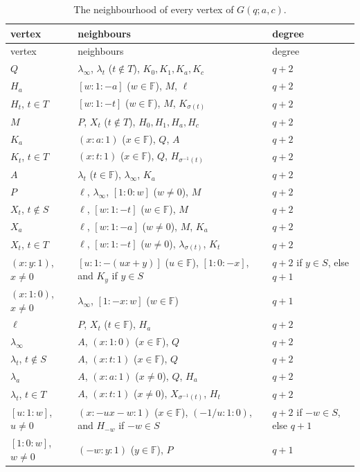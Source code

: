 \documentclass[11pt]{amsart}
\theoremstyle{definition}
\theoremstyle{remark}
\numberwithin{equation}{section}
\newcommand{\F}{\mathbb F}
\begin{document}
\begin{longtable}{@{}l p{8.4cm} l@{}}
\caption{The neighbourhood of every vertex of $G(q;a,c)$.}\label{tab:hat4}\\
\toprule vertex & neighbours & degree\\ \midrule\endfirsthead
\toprule vertex & neighbours & degree\\ \midrule\endhead
\bottomrule\endfoot
$Q$ & $\lambda_\infty$, $\lambda_t$ ($t\notin T$), $K_0,K_1,K_a,K_c$ & $q+2$\\
$H_a$ & $[w:1:-a]$ ($w\in\F$), $M$, $\ell$ & $q+2$\\
$H_t$, $t\in T$ & $[w:1:-t]$ ($w\in\F$), $M$, $K_{\sigma(t)}$ & $q+2$\\
$M$ & $P$, $X_t$ ($t\notin T$), $H_0,H_1,H_a,H_c$ & $q+2$\\
$K_a$ & $(x:a:1)$ ($x\in\F$), $Q$, $A$ & $q+2$\\
$K_t$, $t\in T$ & $(x:t:1)$ ($x\in\F$), $Q$, $H_{\sigma^{-1}(t)}$ & $q+2$\\
$A$ & $\lambda_t$ ($t\in\F$), $\lambda_\infty$, $K_a$ & $q+2$\\
$P$ & $\ell$, $\lambda_\infty$, $[1:0:w]$ ($w\ne0$), $M$ & $q+2$\\
$X_t$, $t\notin S$ & $\ell$, $[w:1:-t]$ ($w\in\F$), $M$ & $q+2$\\
$X_a$ & $\ell$, $[w:1:-a]$ ($w\ne0$), $M$, $K_a$ & $q+2$\\
$X_t$, $t\in T$ & $\ell$, $[w:1:-t]$ ($w\ne0$), $\lambda_{\sigma(t)}$, $K_t$ & $q+2$\\
$(x:y:1)$, $x\ne0$ & $[u:1:-(ux+y)]$ ($u\in\F$), $[1:0:-x]$, and $K_y$ if $y\in S$ & $q+2$ if $y\in S$, else $q+1$\\
$(x:1:0)$, $x\ne0$ & $\lambda_\infty$, $[1:-x:w]$ ($w\in\F$) & $q+1$\\
$\ell$ & $P$, $X_t$ ($t\in\F$), $H_a$ & $q+2$\\
$\lambda_\infty$ & $A$, $(x:1:0)$ ($x\in\F$), $Q$ & $q+2$\\
$\lambda_t$, $t\notin S$ & $A$, $(x:t:1)$ ($x\in\F$), $Q$ & $q+2$\\
$\lambda_a$ & $A$, $(x:a:1)$ ($x\ne0$), $Q$, $H_a$ & $q+2$\\
$\lambda_t$, $t\in T$ & $A$, $(x:t:1)$ ($x\ne0$), $X_{\sigma^{-1}(t)}$, $H_t$ & $q+2$\\
$[u:1:w]$, $u\ne0$ & $(x:-ux-w:1)$ ($x\in\F$), $(-1/u:1:0)$, and $H_{-w}$ if $-w\in S$ & $q+2$ if $-w\in S$, else $q+1$\\
$[1:0:w]$, $w\ne0$ & $(-w:y:1)$ ($y\in\F$), $P$ & $q+1$\\
\end{longtable}
\end{document}
